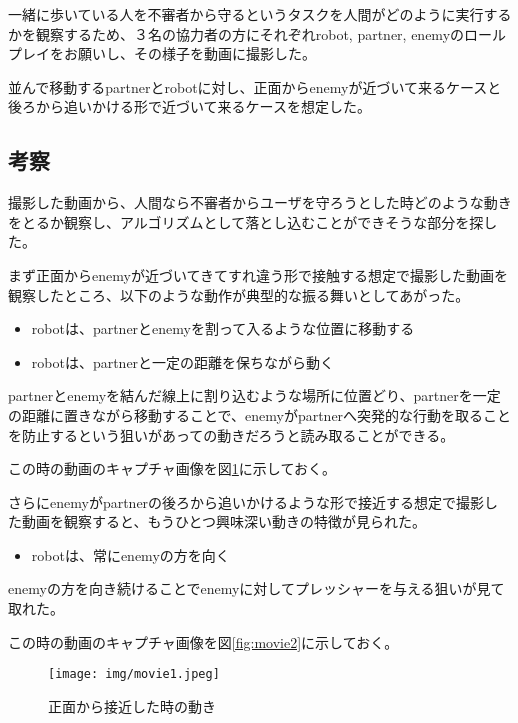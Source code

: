 \documentclass{kuisthesis}
\begin{document}
一緒に歩いている人を不審者から守るというタスクを人間がどのように実行するかを観察するため、３名の協力者の方にそれぞれrobot, partner, enemyのロールプレイをお願いし、その様子を動画に撮影した。

並んで移動するpartnerとrobotに対し、正面からenemyが近づいて来るケースと後ろから追いかける形で近づいて来るケースを想定した。

\subsection{考察}
撮影した動画から、人間なら不審者からユーザを守ろうとした時どのような動きをとるか観察し、アルゴリズムとして落とし込むことができそうな部分を探した。

まず正面からenemyが近づいてきてすれ違う形で接触する想定で撮影した動画を観察したところ、以下のような動作が典型的な振る舞いとしてあがった。

\begin{itemize}
\item robotは、partnerとenemyを割って入るような位置に移動する
\item robotは、partnerと一定の距離を保ちながら動く
\end{itemize}

partnerとenemyを結んだ線上に割り込むような場所に位置どり、partnerを一定の距離に置きながら移動することで、enemyがpartnerへ突発的な行動を取ることを防止するという狙いがあっての動きだろうと読み取ることができる。

この時の動画のキャプチャ画像を図\ref{fig:movie1}に示しておく。



さらにenemyがpartnerの後ろから追いかけるような形で接近する想定で撮影した動画を観察すると、もうひとつ興味深い動きの特徴が見られた。

\begin{itemize}
\item robotは、常にenemyの方を向く
\end{itemize}

enemyの方を向き続けることでenemyに対してプレッシャーを与える狙いが見て取れた。

この時の動画のキャプチャ画像を図\ref{fig:movie2}に示しておく。

\begin{figure}[p]\begin{center}
	\texttt{[image: img/movie1.jpeg]}
	\caption{正面から接近した時の動き}
	\label{fig:movie1}
\end{center}\end{figure}
\end{document}
